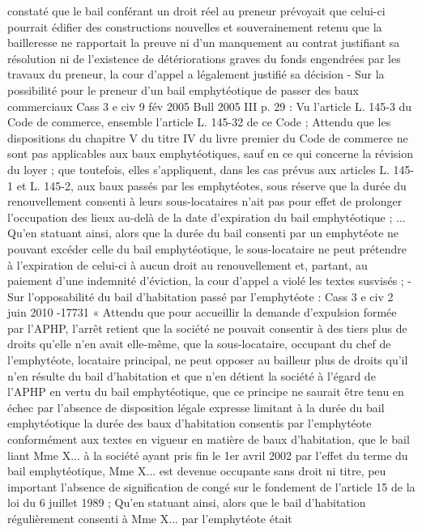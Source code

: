 \documentclass[11pt,a4paper]{report}
\begin{document}
	constaté que le bail conférant un droit réel au preneur prévoyait que celui-ci pourrait édifier des constructions
	nouvelles et souverainement retenu que la bailleresse ne rapportait la preuve ni d'un manquement au contrat
	justifiant sa résolution ni de l'existence de détériorations graves du fonds engendrées par les travaux du preneur,
	la cour d'appel a légalement justifié sa décision
	- Sur la possibilité pour le preneur d’un bail emphytéotique de passer des baux commerciaux Cass 3 e civ 9
	fév 2005 Bull 2005 III  p. 29 : Vu l'article L. 145-3 du Code de commerce, ensemble l'article L. 145-32 de
	ce Code ;
	Attendu que les dispositions du chapitre V du titre IV du livre premier du Code de commerce ne sont pas
	applicables aux baux emphytéotiques, sauf en ce qui concerne la révision du loyer ; que toutefois, elles
	s'appliquent, dans les cas prévus aux articles L. 145-1 et L. 145-2, aux baux passés par les emphytéotes, sous
	réserve que la durée du renouvellement consenti à leurs sous-locataires n'ait pas pour effet de prolonger
	l'occupation des lieux au-delà de la date d'expiration du bail emphytéotique ;
	...
	Qu'en statuant ainsi, alors que la durée du bail consenti par un emphytéote ne pouvant excéder celle du bail
	emphytéotique, le sous-locataire ne peut prétendre à l'expiration de celui-ci à aucun droit au renouvellement et,
	partant, au paiement d'une indemnité d'éviction, la cour d'appel a violé les textes susvisés ;
	- Sur l’opposabilité du bail d’habitation passé par l’emphytéote : Cass 3 e civ 2 juin 2010 -17731
	« Attendu que pour accueillir la demande d'expulsion formée par l'APHP, l'arrêt retient que la société ne
	pouvait consentir à des tiers plus de droits qu'elle n'en avait elle-même, que la sous-locataire, occupant du chef
	de l'emphytéote, locataire principal, ne peut opposer au bailleur plus de droits qu'il n'en résulte du bail
	d'habitation et que n'en détient la société à l'égard de l'APHP en vertu du bail emphytéotique, que ce principe ne
	saurait être tenu en échec par l'absence de disposition légale expresse limitant à la durée du bail emphytéotique
	la durée des baux d'habitation consentis par l'emphytéote conformément aux textes en vigueur en matière de
	baux d'habitation, que le bail liant Mme X... à la société ayant pris fin le 1er avril 2002 par l'effet du terme du
	bail emphytéotique, Mme X... est devenue occupante sans droit ni titre, peu important l'absence de signification
	de congé sur le fondement de l'article 15 de la loi du 6 juillet 1989 ;
	Qu'en statuant ainsi, alors que le bail d'habitation régulièrement consenti à Mme X... par l'emphytéote était
\end{document}
